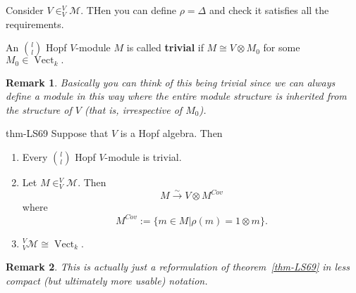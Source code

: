 \documentclass[12pt]{article}
\theoremstyle{break}
\theoremstyle{nonumberbreak}
\theoremstyle{changebreak}
\newtheorem{thm}{Theorem}[subsection]
\newenvironment{thm-prime}[1]
  {\renewcommand{\thethm}{\ref{#1}$'$}%
   \addtocounter{thm}{-1}%
   \begin{thm}}
  {\end{thm}}
\theoremstyle{break}
\theoremstyle{nonumberbreak}
\theoremstyle{nonumberplain}
\theoremstyle{change}
\newtheorem{rmk}[thm]{Remark}
\newcommand*{\Vectk}{\operatorname{Vect}_k}
\begin{document}
\begin{ex}
	Consider $V\in _V^V\mathcal{M}$. THen you can define $\rho=\Delta$ and check it satisfies all the requirements.
\end{ex}
\begin{defn}
	An $\binom{l}{l}$ Hopf $V$-module $M$ is called \textbf{trivial} if $M\cong V\otimes M_0$ for some $M_0\in\Vectk.$
\end{defn}
\begin{rmk}
	Basically you can think of this being trivial since we can \textit{always} define a module in this way
	where the entire module structure is inherited from the structure of $V$ (that is, irrespective of $M_0$).
\end{rmk}
\begin{thm-prime}{thm-LS69}%
	Suppose that $V$ is a Hopf algebra. Then
	\begin{enumerate}
		\item Every $\binom{l}{l}$ Hopf $V$-module is trivial.
		\item Let $M\in _V^V\mathcal{M}$. Then 
		\[M\xrightarrow{\sim} V\otimes M^{Cov}\]
		where
		\[M^{Cov}:=\{m\in M|\rho(m)=1\otimes m\}.\]
		\item $_V^V\mathcal{M}\cong \Vectk$.
	\end{enumerate}
\end{thm-prime}
\begin{rmk}
	This is actually just a reformulation of theorem~\ref{thm-LS69} in less compact (but ultimately more usable) notation.
\end{rmk}
\end{document}

